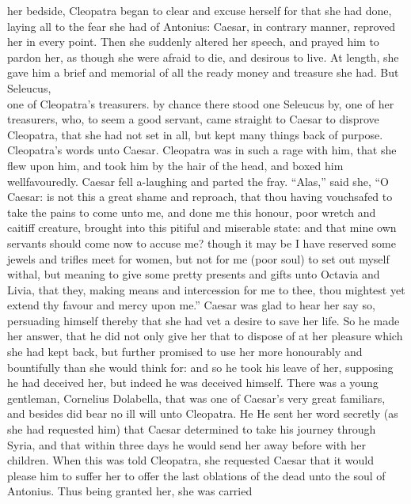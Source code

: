 \documentclass{book}
\begin{document}
her bedside, Cleopatra began to clear and excuse herself for that
she had done, laying all to the fear she had of Antonius: Caesar,
in contrary manner, reproved her in every point. Then she suddenly
altered her speech, and prayed him to pardon her, as though she were
afraid to die, and desirous to live. At length, she gave him a brief
and memorial of all the ready money and treasure she had. But \gloss
{Seleucus,\\ one of Cleopatra's treasurers.} by chance there stood one
Seleucus by, one of her treasurers, who, to seem a good servant, came
straight to Caesar to disprove Cleopatra, that she had not set in all,
but kept many things back of purpose. Cleopatra's words unto Caesar.
Cleopatra was in such a rage with him, that she
flew upon him, and took him by the hair of the head, and boxed
him wellfavouredly. Caesar fell a-laughing and parted the fray. ``Alas,''
said she, ``O Caesar: is not this a great shame and reproach, that thou
having vouchsafed to take the pains to come unto me, and done me this
honour, poor wretch and caitiff creature, brought into this pitiful
and miserable state: and that mine own servants should come now to
accuse me? though it may be I have reserved some jewels and trifles
meet for women, but not for me (poor soul) to set out myself withal,
but meaning to give some pretty presents and gifts unto Octavia and
Livia, that they, making means and intercession for me to thee, thou
mightest yet extend thy favour and mercy upon me.'' Caesar was glad to
hear her say so, persuading himself thereby that she had vet a desire
to save her life. So he made her answer, that he did not only give
her that to dispose of at her pleasure which she had kept back, but
further promised to use her more honourably and bountifully than she
would think for: and so he took his leave of her, supposing he had
deceived her, but indeed he was deceived himself.
There was a young gentleman, Cornelius Dolabella, that was one of
Caesar's very great familiars, and besides did bear no ill will unto
Cleopatra. He  He sent her word secretly (as she had
requested him) that Caesar determined to take his journey through
Syria, and that within three days he would send her away before with
her children. When this was told Cleopatra, she requested Caesar
that it would please him to suffer her to offer the last oblations
of the dead unto the soul of Antonius. Thus
being granted her, she was carried
\end{document}
